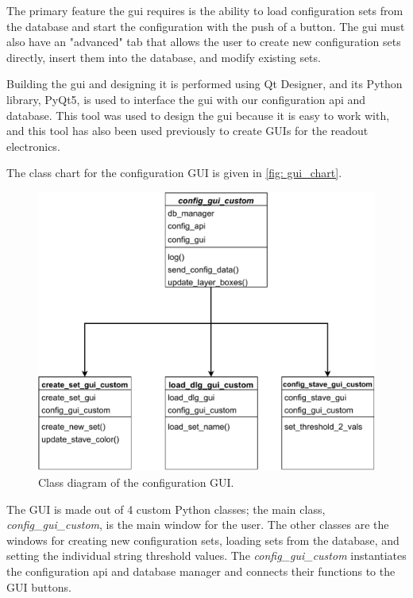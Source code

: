 \documentclass[main.tex]{subfiles}
\begin{document}
The primary feature the \gls{gui} requires is the ability to load configuration sets from the database and start the configuration with the push of a button. The \gls{gui} must also have an "advanced" tab that allows the user to create new configuration sets directly, insert them into the database, and modify existing sets.

Building the \gls{gui} and designing it is performed using Qt Designer, and its Python library, PyQt5, is used to interface the \gls{gui} with our configuration \gls{api} and database. This tool was used to design the \gls{gui} because it is easy to work with, and this tool has also been used previously to create GUIs for the readout electronics.


The class chart for the configuration GUI is given in \autoref{fig: gui_chart}.

\begin{figure}[!ht]
    \centering
    \includegraphics[width=12cm, scale=1.5]{images/gui_class_diagram.pdf}
    \caption{Class diagram of the configuration GUI.}
    \label{fig: gui_chart}
\end{figure}
\FloatBarrier

The GUI is made out of 4 custom Python classes; the main class, \textit{config\_gui\_custom}, is the main window for the user. The other classes are the windows for creating new configuration sets, loading sets from the database, and setting the individual string threshold values. The \textit{config\_gui\_custom} instantiates the configuration \gls{api} and database manager and connects their functions to the GUI buttons.
\end{document}
